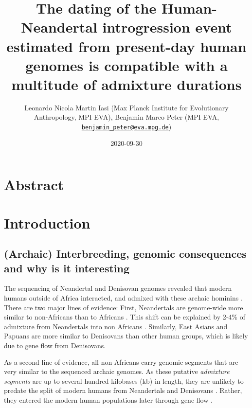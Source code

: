 \documentclass[]{article}
\title{The dating of the Human-Neandertal introgression event estimated from present-day human genomes is compatible with a multitude of admixture durations}
\author{Leonardo Nicola Martin Iasi (Max Planck Institute for Evolutionary
Anthropology, MPI EVA), Benjamin Marco Peter (MPI EVA,
\href{mailto:benjamin_peter@eva.mpg.de}{\nolinkurl{benjamin\_peter@eva.mpg.de}})}
\date{2020-09-30}
\begin{document}
\maketitle

\section{Abstract}\label{abstract}

\section{Introduction}\label{introduction}



\subsection{(Archaic) Interbreeding, genomic consequences and why is it interesting}\label{(Archaic) Interbreeding, genomic consequences and why is it interesting}

The sequencing of Neandertal \citep{green_draft_2010,prufer_complete_2013,prufer_high-coverage_2017, mafessoni_high_coverage_2020} and Denisovan genomes \citep{reich_genetic_2010, meyer_high-coverage_2012} revealed that modern humans outside of Africa interacted, and admixed with these archaic hominins \citep{vernot_resurrecting_2014,fu_genome_2014,fu_early_2015,sankararaman_genomic_2014,sankararaman_combined_2016,vernot_excavating_2016,malaspinas_genomic_2016}. There are two major lines of evidence: First, Neandertals are genome-wide more similar to non-Africans than to Africans \citep{green_draft_2010, meyer_high-coverage_2012}. This shift can be explained by 2-4\% of admixture from Neandertals into non Africans \citep{green_draft_2010, prufer_complete_2013}. Similarly, East Asians and Papuans are more similar to Denisovans \citep{meyer_high-coverage_2012} than other human groups, which is likely due to gene flow from Denisovans. 

As a second line of evidence, all non-Africans carry genomic segments that are very similar to the sequenced archaic genomes. As these putative \emph{admixture segments} are up to several hundred kilobases (kb) in length, they are unlikely to predate the split of modern humans from Neandertals and Denisovans \citep{sankararaman_genomic_2014, vernot_resurrecting_2014}. Rather, they entered the modern human populations later through gene flow \citep{sankararaman_date_2012, sankararaman_combined_2016, vernot_excavating_2016, skov_detecting_2018, skov_nature_2020}. 
\end{document}
